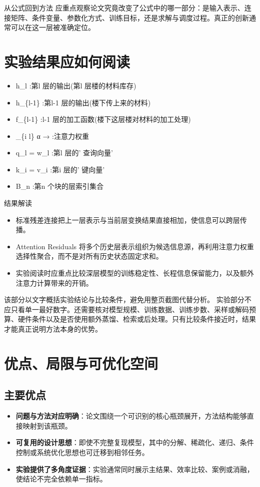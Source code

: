 \documentclass[UTF8,11pt,a4paper]{ctexart}
\newcommand{\term}[1]{\textbf{\textcolor{mainblue}{#1}}}
\begin{document}
\begin{keybox}{从公式回到方法}
应重点观察论文究竟改变了公式中的哪一部分：是输入表示、连接矩阵、条件变量、参数化方式、训练目标，还是求解与调度过程。真正的创新通常可以在这一层被准确定位。
\end{keybox}


\section{实验结果应如何阅读}
\begin{itemize}
\item h\_l :第l 层的输出(第l 层楼的材料库存)
\item h\_\{l-1\} :第l-1 层的输出(楼下传上来的材料)
\item f\_\{l-1\} :l-1 层的加工函数(楼下这层楼对材料的加工处理)
\item \_\{i l\} α → :注意力权重
\item q\_l = w\_l :第l 层的' 查询向量'
\item k\_i = v\_i :第i 层的' 键向量'
\item B\_n :第n 个块的层索引集合
\end{itemize}

\begin{notebox}{结果解读}
\begin{itemize}
\item 标准残差连接把上一层表示与当前层变换结果直接相加，使信息可以跨层传播。
\item Attention Residuals 将多个历史层表示组织为候选信息源，再利用注意力权重选择性聚合，而不是对所有历史状态固定求和。
\item 实验阅读时应重点比较深层模型的训练稳定性、长程信息保留能力，以及额外注意力计算带来的开销。
\end{itemize}
\end{notebox}

该部分以文字概括实验结论与比较条件，避免用整页截图代替分析。
实验部分不应只看单一最好数字。还需要核对模型规模、训练数据、训练步数、采样或解码预算、硬件条件以及是否使用额外蒸馏、检索或后处理。只有比较条件接近时，结果才能真正说明方法本身的优势。

\section{优点、局限与可优化空间}
\subsection{主要优点}
\begin{itemize}
\item \term{问题与方法对应明确}：论文围绕一个可识别的核心瓶颈展开，方法结构能够直接映射到该瓶颈。
\item \term{可复用的设计思想}：即使不完整复现模型，其中的分解、稀疏化、递归、条件控制或系统优化思想也可迁移到相邻任务。
\item \term{实验提供了多角度证据}：实验通常同时展示主结果、效率比较、案例或消融，使结论不完全依赖单一指标。
\end{itemize}
\end{document}
